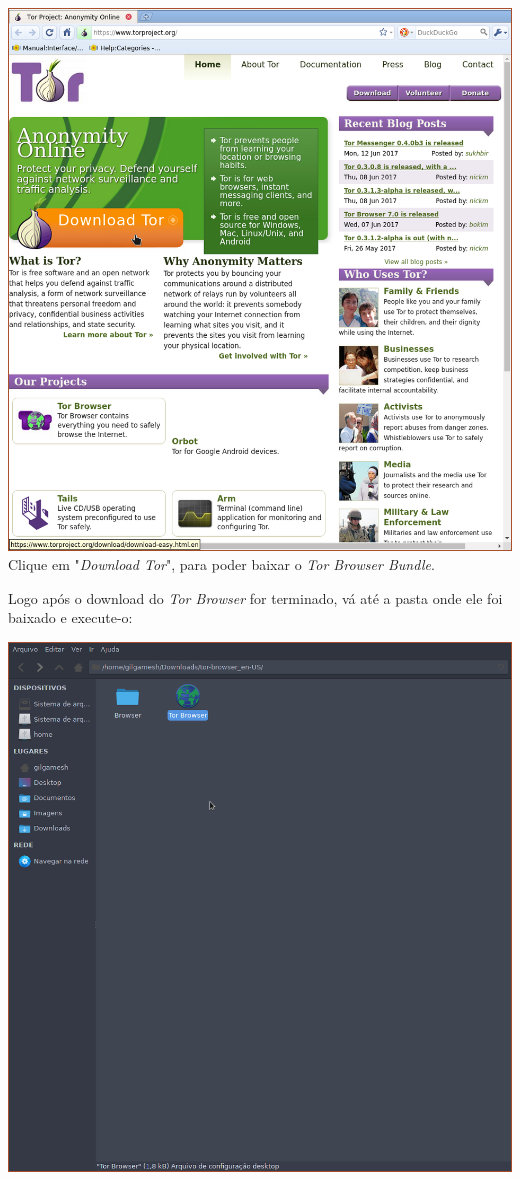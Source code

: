 \documentclass[12pt, letterpaper, DejaVuSansMono:12]{report}
\begin{document}
	\begin{center}
		\includegraphics[scale=0.55]{tbb1.png}\\
		\footnotesize{Clique em "\textit{Download Tor}", para poder baixar o \textit{Tor Browser Bundle}.}
	\end{center}
	
\pagebreak

	Logo após o download do \textit{Tor Browser} for terminado, vá até a pasta onde ele foi baixado e execute-o:

	\begin{center}
		\includegraphics[scale=0.55]{tbb2.png}
	\end{center}
\end{document}
